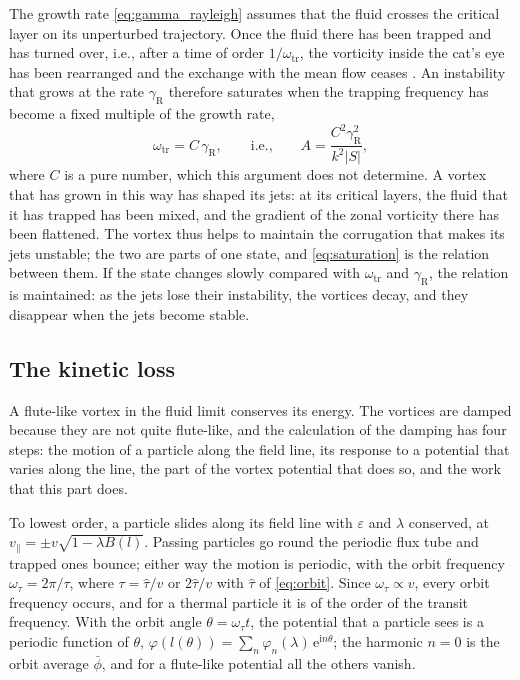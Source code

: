 \documentclass{jpp}
\newcommand{\phibar}{\bar\phi}
\newcommand{\rme}{\text{e}}
\newcommand{\rmi}{\text{i}}
\newcommand{\omtr}{\omega_\text{tr}}
\begin{document}
The growth rate \cref{eq:gamma_rayleigh} assumes that the fluid crosses the critical layer on its unperturbed trajectory. Once the fluid there has been trapped and has turned over, i.e., after a time of order \(1/\omtr\), the vorticity inside the cat's eye has been rearranged and the exchange with the mean flow ceases \citep{ONeil1965, Stewartson1978, WarnWarn1978}. An instability that grows at the rate \(\gamma_\text{R}\) therefore saturates when the trapping frequency has become a fixed multiple of the growth rate,
\begin{equation}
\omtr = C\,\gamma_\text{R},
\qquad\text{i.e.,}\qquad
A = \frac{C^2\gamma_\text{R}^2}{k^2|S|},
\label{eq:saturation}
\end{equation}
where \(C\) is a pure number, which this argument does not determine. A vortex that has grown in this way has shaped its jets: at its critical layers, the fluid that it has trapped has been mixed, and the gradient of the zonal vorticity there has been flattened. The vortex thus helps to maintain the corrugation that makes its jets unstable; the two are parts of one state, and \cref{eq:saturation} is the relation between them. If the state changes slowly compared with \(\omtr\) and \(\gamma_\text{R}\), the relation is maintained: as the jets lose their instability, the vortices decay, and they disappear when the jets become stable.

\subsection{The kinetic loss}\label{sec:loss}

A flute-like vortex in the fluid limit conserves its energy. The vortices are damped because they are not quite flute-like, and the calculation of the damping has four steps: the motion of a particle along the field line, its response to a potential that varies along the line, the part of the vortex potential that does so, and the work that this part does.

To lowest order, a particle slides along its field line with \(\varepsilon\) and \(\lambda\) conserved, at \(v_\parallel = \pm v\sqrt{1-\lambda B(l)}\). Passing particles go round the periodic flux tube and trapped ones bounce; either way the motion is periodic, with the orbit frequency \(\omega_\tau = 2\pi/\tau\), where \(\tau = \hat\tau/v\) or \(2\hat\tau/v\) with \(\hat\tau\) of \cref{eq:orbit}. Since \(\omega_\tau\propto v\), every orbit frequency occurs, and for a thermal particle it is of the order of the transit frequency. With the orbit angle \(\theta = \omega_\tau t\), the potential that a particle sees is a periodic function of \(\theta\), \(\varphi(l(\theta)) = \sum_n\varphi_n(\lambda)\,\rme^{\rmi n\theta}\); the harmonic \(n = 0\) is the orbit average \(\phibar\), and for a flute-like potential all the others vanish.
\end{document}
